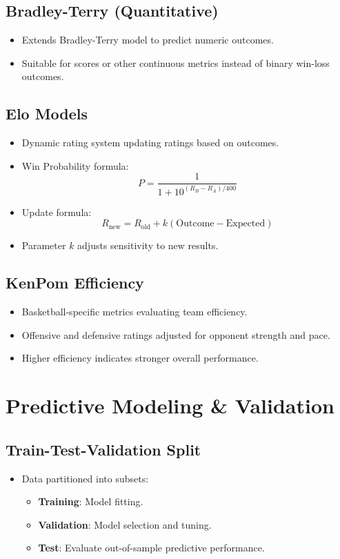 \documentclass[10pt, landscape]{article}
\begin{document}
\begin{multicols}{3}
\subsection{Bradley-Terry (Quantitative)}
\begin{itemize}[noitemsep]
    \item Extends Bradley-Terry model to predict numeric outcomes.
    \item Suitable for scores or other continuous metrics instead of binary win-loss outcomes.
\end{itemize}

\subsection{Elo Models}
\begin{itemize}[noitemsep]
    \item Dynamic rating system updating ratings based on outcomes.
    \item Win Probability formula:
    \[ P = \frac{1}{1 + 10^{(R_B - R_A)/400}} \]
    \item Update formula:
    \[ R_{\text{new}} = R_{\text{old}} + k(\text{Outcome} - \text{Expected}) \]
    \item Parameter \(k\) adjusts sensitivity to new results.
\end{itemize}

\subsection{KenPom Efficiency}
\begin{itemize}[noitemsep]
    \item Basketball-specific metrics evaluating team efficiency.
    \item Offensive and defensive ratings adjusted for opponent strength and pace.
    \item Higher efficiency indicates stronger overall performance.
\end{itemize}

\section{Predictive Modeling \& Validation}

\subsection{Train-Test-Validation Split}
\begin{itemize}[noitemsep]
    \item Data partitioned into subsets:
    \begin{itemize}[noitemsep]
        \item \textbf{Training}: Model fitting.
        \item \textbf{Validation}: Model selection and tuning.
        \item \textbf{Test}: Evaluate out-of-sample predictive performance.
    \end{itemize}
\end{itemize}


\end{multicols}
\end{document}
